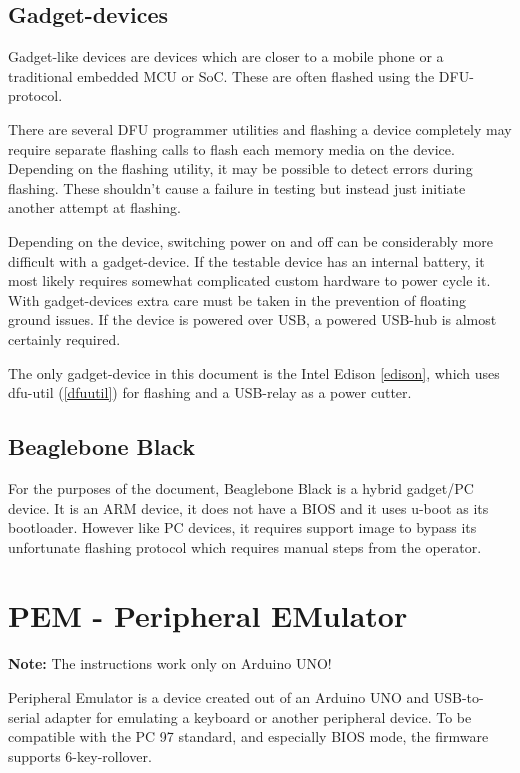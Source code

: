 \documentclass[a4paper,11pt]{article}
\newcommand{\note}{\textbf{Note: }}
\begin{document}
\subsection{Gadget-devices}

Gadget-like devices are devices which are closer to a mobile phone or a traditional embedded MCU or SoC. These are often flashed using the DFU-protocol.

There are several DFU programmer utilities and flashing a device completely may require separate flashing calls to flash each memory media on the device. Depending on the flashing utility, it may be possible to detect errors during flashing. These shouldn't cause a failure in testing but instead just initiate another attempt at flashing.

Depending on the device, switching power on and off can be considerably more difficult with a gadget-device. If the testable device has an internal battery, it most likely requires somewhat complicated custom hardware to power cycle it. With gadget-devices extra care must be taken in the prevention of floating ground issues. If the device is powered over USB, a powered USB-hub is almost certainly required.

The only gadget-device in this document is the Intel Edison \ref{edison}, which uses dfu-util (\ref{dfuutil}) for flashing and a USB-relay as a power cutter.

\subsection{Beaglebone Black}
\label{bbb}

For the purposes of the document, Beaglebone Black is a hybrid gadget/PC device. It is an ARM device, it does not have a BIOS and it uses u-boot as its bootloader. However like PC devices, it requires support image to bypass its unfortunate flashing protocol which requires manual steps from the operator. 

\pagebreak

\section{PEM - Peripheral EMulator}
\label{pem}

\note{The instructions work only on Arduino UNO!}

Peripheral Emulator is a device created out of an Arduino UNO and USB-to-serial adapter for emulating a keyboard or another peripheral device. To be compatible with the PC 97 standard, and especially BIOS mode, the firmware supports 6-key-rollover.
\end{document}
